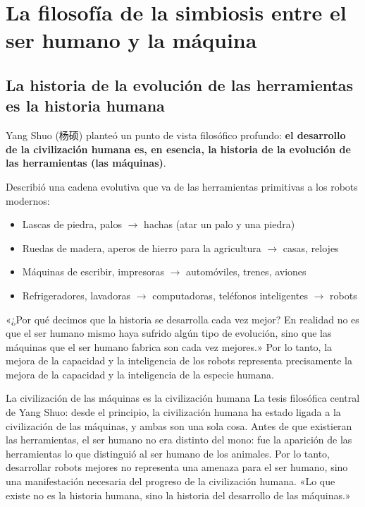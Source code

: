 \section{La filosofía de la simbiosis entre el ser humano y la máquina}

\subsection{La historia de la evolución de las herramientas es la historia humana}

Yang Shuo (杨硕) planteó un punto de vista filosófico profundo: \textbf{el desarrollo de la civilización humana es, en esencia, la historia de la evolución de las herramientas (las máquinas)}.

Describió una cadena evolutiva que va de las herramientas primitivas a los robots modernos:
\begin{itemize}
    \item Lascas de piedra, palos $\to$ hachas (atar un palo y una piedra)
    \item Ruedas de madera, aperos de hierro para la agricultura $\to$ casas, relojes
    \item Máquinas de escribir, impresoras $\to$ automóviles, trenes, aviones
    \item Refrigeradores, lavadoras $\to$ computadoras, teléfonos inteligentes $\to$ robots
\end{itemize}

«¿Por qué decimos que la historia se desarrolla cada vez mejor? En realidad no es que el ser humano mismo haya sufrido algún tipo de evolución, sino que las máquinas que el ser humano fabrica son cada vez mejores.» Por lo tanto, la mejora de la capacidad y la inteligencia de los robots representa precisamente la mejora de la capacidad y la inteligencia de la especie humana.

\begin{importantbox}{La civilización de las máquinas es la civilización humana}
La tesis filosófica central de Yang Shuo: desde el principio, la civilización humana ha estado ligada a la civilización de las máquinas, y ambas son una sola cosa. Antes de que existieran las herramientas, el ser humano no era distinto del mono: fue la aparición de las herramientas lo que distinguió al ser humano de los animales. Por lo tanto, desarrollar robots mejores no representa una amenaza para el ser humano, sino una manifestación necesaria del progreso de la civilización humana. «Lo que existe no es la historia humana, sino la historia del desarrollo de las máquinas.»
\end{importantbox}

